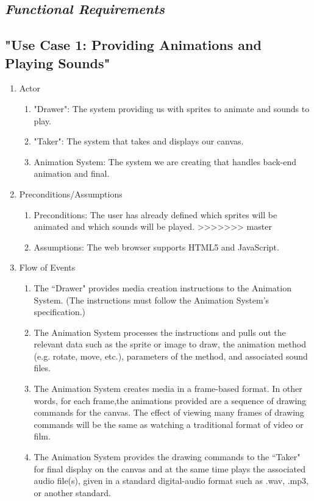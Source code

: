 \documentclass[12pt]{article}
\begin{document}
\begin{enumerate}
\begin{enumerate}
\section{\emph{Functional Requirements}}
	\subsection{"Use Case 1: Providing Animations and Playing Sounds"}
\begin{enumerate}
  \item Actor
  \begin{enumerate}
  		\item "Drawer": The system providing us with sprites to animate and sounds to play.
   		 \item "Taker": The system that takes and displays our canvas.
		\item Animation System: The system we are creating that handles back-end animation and final.
  \end{enumerate}
  \item Preconditions/Assumptions
  \begin{enumerate}
   		 \item Preconditions: The user has already defined which sprites will be animated and which sounds will be played.
>>>>>>> master
   		 \item Assumptions: The web browser supports HTML5 and JavaScript.
  \end{enumerate}
  \item Flow of Events
  \begin{enumerate}
<<<<<<< HEAD
   		 \item The ``Drawer" provides media creation instructions to the Animation System. (The instructions must follow the Animation System's specification.)
   		 \item The Animation System processes the instructions and pulls out the relevant data such as the sprite or image to draw, the animation method (e.g. rotate, move, etc.), parameters of the method, and associated sound files.
		\item The Animation System creates media in a frame-based format. In other words, for each frame,the animations provided are a sequence of drawing commands for the canvas. The effect of viewing many frames of drawing commands will be the same as watching a traditional format of video or film.
		\item The Animation System provides the drawing commands to the ``Taker" for final display on the canvas and at the same time plays the associated audio file(s), given in a standard digital-audio format such as .wav, .mp3, or another standard.

\end{enumerate}
\end{enumerate}
\end{enumerate}
\end{enumerate}
\end{document}
